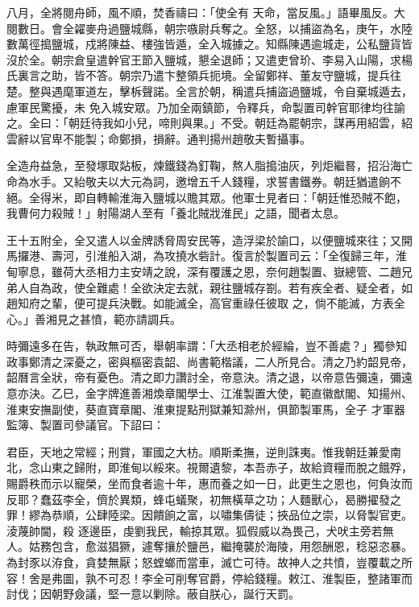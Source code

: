 \begin{pinyinscope}
 八月，全將閱舟師，風不順，焚香禱曰：「使全有
 天命，當反風。」語畢風反。大閱數日。會全糴麥舟過鹽城縣，朝宗嗾尉兵奪之。全怒，以捕盜為名，庚午，水陸數萬徑搗鹽城，戍將陳益、樓強皆遁，全入城據之。知縣陳遇逾城走，公私鹽貨皆沒於全。朝宗倉皇遣幹官王節入鹽城，懇全退師；又遣吏曾玠、李易入山陽，求楊氏裏言之助，皆不答。朝宗乃遣卞整領兵扼境。全留鄭祥、董友守鹽城，提兵往楚。整與遇麾軍道左，擊柝聲諾。全言於朝，稱遣兵捕盜過鹽城，令自棄城遁去，慮軍民驚擾，未
 免入城安眾。乃加全兩鎮節，令釋兵，命製置司幹官耶律均往諭之。全曰：「朝廷待我如小兒，啼則與果。」不受。朝廷為罷朝宗，謀再用紹雲，紹雲辭以官卑不能製；命鄭損，損辭。通判揚州趙敬夫暫攝事。



 全造舟益急，至發塚取煔板，煉鐵錢為釘鞠，熬人脂搗油灰，列炬繼晷，招沿海亡命為水手。又紿敬夫以大元為詞，邀增五千人錢糧，求誓書鐵券。朝廷猶遣餉不絕。全得米，即自轉輸淮海入鹽城以贍其眾。他軍士見者曰：「朝廷惟恐賊不飽，
 我曹何力殺賊！」射陽湖人至有「養北賊戕淮民」之語，聞者太息。



 王十五附全，全又遣人以金牌誘脅周安民等，造浮梁於諭口，以便鹽城來往；又開馬攞港、壽河，引淮船入湖，為攻撓水砦計。復言於製置司云：「全復歸三年，淮甸寧息，雖荷大丞相力主安靖之說，深有覆護之恩，奈何趙製置、嶽總管、二趙兄弟人自為政，使全難處！全欲決定去就，親往鹽城存劄。若有疾全者、疑全者，如趙知府之輩，便可提兵決戰。如能滅全，高官重祿任彼取
 之，倘不能滅，方表全心。」善湘見之甚憤，範亦請調兵。



 時彌遠多在告，執政無可否，舉朝率謂：「大丞相老於經綸，豈不善處？」獨參知政事鄭清之深憂之，密與樞密袁韶、尚書範楷議，二人所見合。清之乃約韶見帝，韶曆言全狀，帝有憂色。清之即力讚討全，帝意決。清之退，以帝意告彌遠，彌遠意亦決。乙巳，金字牌進善湘煥章閣學士、江淮製置大使，範直徽猷閣、知揚州、淮東安撫副使，葵直寶章閣、淮東提點刑獄兼知滁州，俱節製軍馬，全子
 才軍器監簿、製置司參議官。下詔曰：



 君臣，天地之常經；刑賞，軍國之大枋。順斯柔撫，逆則誅夷。惟我朝廷兼愛南北，念山東之歸附，即淮甸以綏來。視爾遺黎，本吾赤子，故給資糧而脫之餓殍，賜爵秩而示以寵榮，坐而食者逾十年，惠而養之如一日，此更生之恩也，何負汝而反耶？蠢茲李全，儕於異類，蜂屯蟻聚，初無橫草之功；人麵獸心，曷勝擢發之罪！繆為恭順，公肆陸梁。因饋餉之富，以嘯集儔徒；挾品位之崇，以脅製官吏。淩蔑帥閫，殺
 逐邊臣，虔劉我民，輸掠其眾。狐假威以為畏己，犬吠主旁若無人。姑務包含，愈滋猖獗，遽奪攘於鹽邑，繼掩襲於海陵，用怨酬恩，稔惡恣暴。為封豕以洊食，貪婪無厭；怒螳螂而當車，滅亡可待。故神人之共憤，豈覆載之所容！舍是弗圖，孰不可忍！李全可削奪官爵，停給錢糧。敕江、淮製臣，整諸軍而討伐；因朝野僉議，堅一意以剿除。蔽自朕心，誕行天罰。




\end{pinyinscope}
